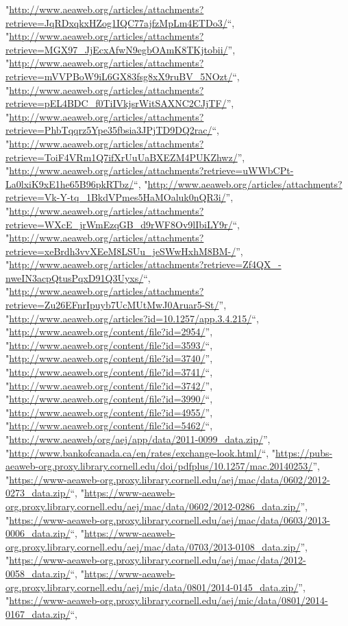 \documentclass[]{article}
\begin{document}
\begin{itemize}
  "\url{http://www.aeaweb.org/articles/attachments?retrieve=JqRDxqkxHZog1IQC77ajfzMpLm4ETDo3/}``,
  "\url{http://www.aeaweb.org/articles/attachments?retrieve=MGX97_JjEcxAfwN9egbOAmK8TKjtobii/}'',
  "\url{http://www.aeaweb.org/articles/attachments?retrieve=mVVPBoW9iL6GX83fsg8xX9ruBV_5NOzt/}``,
  "\url{http://www.aeaweb.org/articles/attachments?retrieve=pEL4BDC_f0TiIVkjsrWitSAXNC2CJjTF/}'',
  "\url{http://www.aeaweb.org/articles/attachments?retrieve=PhbTqqrz5Ype35fbsia3JPjTD9DQ2rac/}``,
  "\url{http://www.aeaweb.org/articles/attachments?retrieve=ToiF4VRm1Q7ifXrUuUaBXEZM4PUKZhwz/}'',
  "\url{http://www.aeaweb.org/articles/attachments?retrieve=uWWbCPt-La0lxiK9xE1he65B96pkRTbz/}``,
  "\url{http://www.aeaweb.org/articles/attachments?retrieve=Vk-Y-tq_1BkdVPmes5HaMOaluk0nQR3i/}'',
  "\url{http://www.aeaweb.org/articles/attachments?retrieve=WXcE_jrWmEzqGB_d9rWF8Ov9lIbiLY9r/}``,
  "\url{http://www.aeaweb.org/articles/attachments?retrieve=xeBrdh3vvXEeM8LSUu_jeSWwHxhM8BM-/}'',
  "\url{http://www.aeaweb.org/articles/attachments?retrieve=Zf4QX_-nweIN3acpQtusPqxD91Q3Uyxs/}``,
  "\url{http://www.aeaweb.org/articles/attachments?retrieve=Zu26EFnrIpuyb7UcMUtMwJ0Aruar5-St/}'',
  "\url{http://www.aeaweb.org/articles?id=10.1257/app.3.4.215/}``,
  "\url{http://www.aeaweb.org/content/file?id=2954/}'',
  "\url{http://www.aeaweb.org/content/file?id=3593/}``,
  "\url{http://www.aeaweb.org/content/file?id=3740/}'',
  "\url{http://www.aeaweb.org/content/file?id=3741/}``,
  "\url{http://www.aeaweb.org/content/file?id=3742/}'',
  "\url{http://www.aeaweb.org/content/file?id=3990/}``,
  "\url{http://www.aeaweb.org/content/file?id=4955/}'',
  "\url{http://www.aeaweb.org/content/file?id=5462/}``,
  "\url{http://www.aeaweb/org/aej/app/data/2011-0099_data.zip/}'',
  "\url{http://www.bankofcanada.ca/en/rates/exchange-look.html/}``,
  "\url{https://pubs-aeaweb-org.proxy.library.cornell.edu/doi/pdfplus/10.1257/mac.20140253/}'',
  "\url{https://www-aeaweb-org.proxy.library.cornell.edu/aej/mac/data/0602/2012-0273_data.zip/}``,
  "\url{https://www-aeaweb-org.proxy.library.cornell.edu/aej/mac/data/0602/2012-0286_data.zip/}'',
  "\url{https://www-aeaweb-org.proxy.library.cornell.edu/aej/mac/data/0603/2013-0006_data.zip/}``,
  "\url{https://www-aeaweb-org.proxy.library.cornell.edu/aej/mac/data/0703/2013-0108_data.zip/}'',
  "\url{https://www-aeaweb-org.proxy.library.cornell.edu/aej/mac/data/2012-0058_data.zip/}``,
  "\url{https://www-aeaweb-org.proxy.library.cornell.edu/aej/mic/data/0801/2014-0145_data.zip/}'',
  "\url{https://www-aeaweb-org.proxy.library.cornell.edu/aej/mic/data/0801/2014-0167_data.zip/}``,

\end{itemize}
\end{document}
